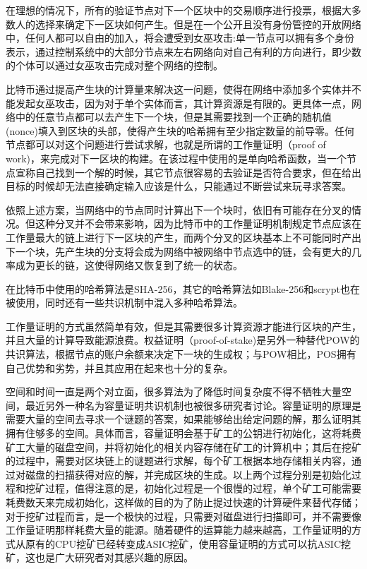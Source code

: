在理想的情况下，所有的验证节点对下一个区块中的交易顺序进行投票，根据大多数人的选择来确定下一区块如何产生。但是在一个公开且没有身份管控的开放网络中，任何人都可以自由的加入，将会遭受到女巫攻击\cite{douceur2002sybil}:单一节点可以拥有多个身份表示，通过控制系统中的大部分节点来左右网络向对自己有利的方向进行，即少数的个体可以通过女巫攻击完成对整个网络的控制。

比特币通过提高产生块的计算量来解决这一问题，使得在网络中添加多个实体并不能发起女巫攻击，因为对于单个实体而言，其计算资源是有限的。更具体一点，网络中的任意节点都可以去产生下一个块，但是其需要找到一个正确的随机值(nonce)填入到区块的头部，使得产生块的哈希拥有至少指定数量的前导零\cite{antonopoulos2014mastering}。任何节点都可以对这个问题进行尝试求解，也就是所谓的工作量证明（proof of work)，来完成对下一区块的构建\cite{nakamoto2008bitcoin}。在该过程中使用的是单向哈希函数，当一个节点宣称自己找到一个解的时候，其它节点很容易的去验证是否符合要求，但在给出目标的时候却无法直接确定输入应该是什么，只能通过不断尝试来玩寻求答案。

依照上述方案，当网络中的节点同时计算出下一个块时，依旧有可能存在分叉的情况。但这种分叉并不会带来影响，因为比特币中的工作量证明机制规定节点应该在工作量最大的链上进行下一区块的产生，而两个分叉的区块基本上不可能同时产出下一个块，先产生块的分支将会成为网络中被网络中节点选中的链，会有更大的几率成为更长的链，这使得网络又恢复到了统一的状态。

在比特币中使用的哈希算法是SHA-256，其它的哈希算法如Blake-256和scrypt也在被使用，同时还有一些共识机制中混入多种哈希算法。

工作量证明的方式虽然简单有效，但是其需要很多计算资源才能进行区块的产生，并且大量的计算导致能源浪费。权益证明（proof-of-stake)是另外一种替代POW的共识算法，根据节点的账户余额来决定下一块的生成权；与POW相比，POS拥有自己优势和劣势，并且其应用在起来也十分的复杂。

空间和时间一直是两个对立面，很多算法为了降低时间复杂度不得不牺牲大量空间，最近另外一种名为容量证明共识机制也被很多研究者讨论。容量证明\cite{ateniese2014proofs}的原理是需要大量的空间去寻求一个谜题的答案，如果能够给出给定问题的解，那么证明其拥有住够多的空间。具体而言，容量证明会基于矿工的公钥进行初始化，这将耗费矿工大量的磁盘空间，并将初始化的相关内容存储在矿工的计算机中；其后在挖矿的过程中，需要对区块链上的谜题进行求解，每个矿工根据本地存储相关内容，通过对磁盘的扫描获得对应的解，并完成区块的生成。以上两个过程分别是初始化过程和挖矿过程，值得注意的是，初始化过程是一个很慢的过程，单个矿工可能需要耗费数天来完成初始化，这样做的目的为了防止提过快速的计算硬件来替代存储；对于挖矿过程而言，是一个极快的过程，只需要对磁盘进行扫描即可，并不需要像工作量证明那样耗费大量的能源。随着硬件的运算能力越来越高，工作量证明的方式从原有的CPU挖矿已经转变成ASIC挖矿，使用容量证明的方式可以抗ASIC挖矿，这也是广大研究者对其感兴趣的原因。


